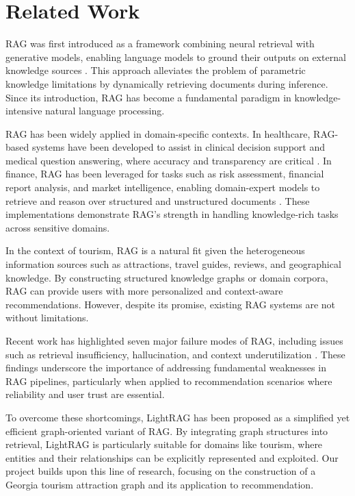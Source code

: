 \documentclass{article} %
\begin{document}
\section{Related Work}

RAG was first introduced as a framework combining neural retrieval with generative models, enabling language models to ground their outputs on external knowledge sources \citep{Lewis2020}. This approach alleviates the problem of parametric knowledge limitations by dynamically retrieving documents during inference. Since its introduction, RAG has become a fundamental paradigm in knowledge-intensive natural language processing.

RAG has been widely applied in domain-specific contexts. In healthcare, RAG-based systems have been developed to assist in clinical decision support and medical question answering, where accuracy and transparency are critical \citep{Lee2023, Jin2023}. In finance, RAG has been leveraged for tasks such as risk assessment, financial report analysis, and market intelligence, enabling domain-expert models to retrieve and reason over structured and unstructured documents \citep{Wang2023}. These implementations demonstrate RAG’s strength in handling knowledge-rich tasks across sensitive domains.

In the context of tourism, RAG is a natural fit given the heterogeneous information sources such as attractions, travel guides, reviews, and geographical knowledge. By constructing structured knowledge graphs or domain corpora, RAG can provide users with more personalized and context-aware recommendations. However, despite its promise, existing RAG systems are not without limitations.

Recent work has highlighted seven major failure modes of RAG, including issues such as retrieval insufficiency, hallucination, and context underutilization \citep{Xu2024}. These findings underscore the importance of addressing fundamental weaknesses in RAG pipelines, particularly when applied to recommendation scenarios where reliability and user trust are essential.

To overcome these shortcomings, LightRAG \citep{Zhu2024} has been proposed as a simplified yet efficient graph-oriented variant of RAG. By integrating graph structures into retrieval, LightRAG is particularly suitable for domains like tourism, where entities and their relationships can be explicitly represented and exploited. Our project builds upon this line of research, focusing on the construction of a Georgia tourism attraction graph and its application to recommendation.
\end{document}
